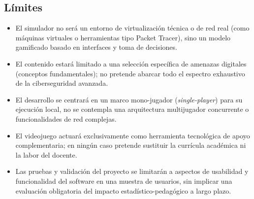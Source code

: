 \subsection{Límites}
\begin{itemize}
  \item El simulador no será un entorno de virtualización técnica o de red real (como máquinas virtuales o herramientas tipo Packet Tracer), sino un modelo gamificado basado en interfaces y toma de decisiones.
  \item El contenido estará limitado a una selección específica de amenazas digitales (conceptos fundamentales); no pretende abarcar todo el espectro exhaustivo de la ciberseguridad avanzada.
  \item El desarrollo se centrará en un marco mono-jugador (\textit{single-player}) para su ejecución local, no se contempla una arquitectura multijugador concurrente o funcionalidades de red complejas.
  \item El videojuego actuará exclusivamente como herramienta tecnológica de apoyo complementaria; en ningún caso pretende sustituir la currícula académica ni la labor del docente.
  \item Las pruebas y validación del proyecto se limitarán a aspectos de usabilidad y funcionalidad del software en una muestra de usuarios, sin implicar una evaluación obligatoria del impacto estadístico-pedagógico a largo plazo.
\end{itemize}
